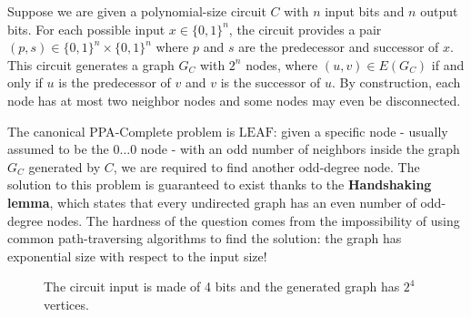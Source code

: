 Suppose we are given a polynomial-size circuit $C$ with $n$ input bits and $n$ output bits. For each possible input $x \in \{0,1\}^n$, the circuit provides a pair $(p,s) \in \{0,1\}^n \times \{0,1\}^n$ where $p$ and $s$ are the predecessor and successor of $x$. This circuit generates a graph $G_C$ with $2^n$ nodes, where $(u,v) \in E(G_C)$ if and only if $u$ is the predecessor of $v$ and $v$ is the successor of $u$. By construction, each node has at most two neighbor nodes and some nodes may even be disconnected.

The canonical \textsf{PPA}-Complete problem is $\mathrm{LEAF}$: given a specific node - usually assumed to be the $0 \ldots 0$ node - with an odd number of neighbors inside the graph $G_C$ generated by $C$, we are required to find another odd-degree node. The solution to this problem is guaranteed to exist thanks to the \textbf{Handshaking lemma}, which states that every undirected graph has an even number of odd-degree nodes. The hardness of the question comes from the impossibility of using common path-traversing algorithms to find the solution: the graph has exponential size with respect to the input size!

\begin{figure}[H]
    \centering
    
    \caption{The circuit input is made of 4 bits and the generated graph has $2^4$ vertices.}
\end{figure}


